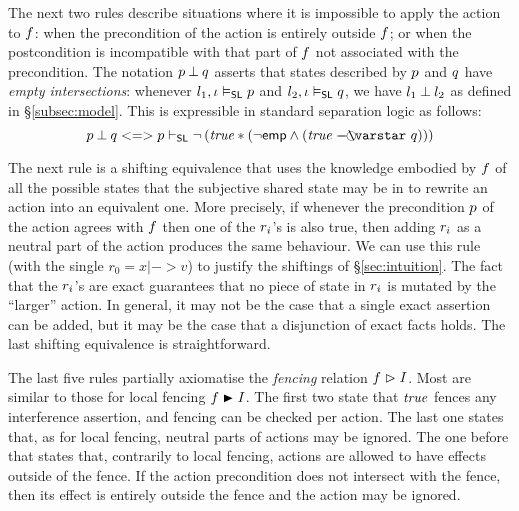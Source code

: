 The next two rules describe situations where  it is impossible to apply the
action to $\lass{F}$: when the precondition  of the action is
entirely outside  $\lass{F}$; or when the postcondition is
incompatible  with that part of  $\lass{F} $ not associated with the
precondition. 
The notation $\separate{\lass{P}}{\lass{Q}}$ asserts that
states described by $\lass{P}$ and $\lass{Q}$ have \emph{empty
  intersections}: whenever $l_1, \lenv \slsat \lass{P}$ and $l_2,
\lenv \slsat \lass{Q}$, we have $l_1 \mathbin{\bot} l_2$ as defined in \S\ref{subsec:model}. This is expressible in standard separation logic as follows:
\[
\separate{\lass{P}}{\lass{Q}} <=> \lass{P} \slentails \neg\left( \m{true} * (\neg\emp \land (\m{true} \septraction \lass{Q}) ) \right)
\]

The next rule is a shifting equivalence that uses the
knowledge embodied by $\lass{F}$ of all the possible states that the
subjective shared state may be in to rewrite an action into an
equivalent one. More precisely, if whenever the precondition
$\lass{P}$ of the action agrees with $\lass{F}$ then one of the
$\lass{R}_i$'s is also true, then adding $\lass{R}_i$ as a neutral
part of the action produces the same behaviour. We can use this rule
(with the single $r_0 = x|->v$) to justify the shiftings of
\S\ref{sec:intuition}. The fact that the $\lass{R}_i$'s are exact
guarantees that no piece of state in $\lass{R}_i$ is mutated by the
``larger'' action.  In general, it may not be the case that a
single exact assertion can be added, but it may be the case that a
disjunction of exact facts holds. The last shifting equivalence is
straightforward.

The last five rules partially axiomatise the \emph{fencing} relation
 $\lass{F}\fences I$. Most are similar to those for local
fencing  $\lass{F}\strictfences I$. The first two state that
$\mathit{true}$ fences any interference assertion, and fencing can be
checked per action. The last one states that, as for local fencing,
neutral parts of actions may be ignored. The one before that states
that, contrarily to local fencing, actions are allowed to have effects
outside of the fence. If the action precondition does not intersect
with the fence, then its effect is entirely outside the fence and
the action may be ignored.

